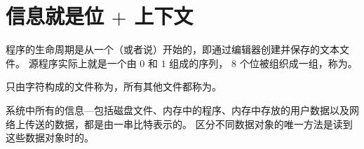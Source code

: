 
\section{信息就是位 $+$ 上下文}
{
    程序的生命周期是从一个（或者说）开始的，即通过编辑器创建并保存的文本文件。
    源程序实际上就是一个由 $0$ 和 $1$ 组成的序列， $8$ 个位被组织成一组，称为。

    只由字符构成的文件称为，所有其他文件都称为。

    系统中所有的信息---包括磁盘文件、内存中的程序、内存中存放的用户数据以及网络上传送的数据，都是由一串比特表示的。
    区分不同数据对象的唯一方法是读到这些数据对象时的。
}
